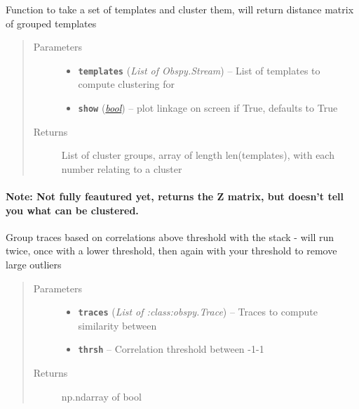 \documentclass[a4paper,10pt,english]{sphinxmanual}
\begin{document}
\begin{fulllineitems}
\label{utils:clustering.cluster}
Function to take a set of templates and cluster them, will return distance            matrix of grouped templates
\begin{quote}\begin{description}
\item[{Parameters}] \leavevmode\begin{itemize}
\item {} 
\textbf{\texttt{templates}} (\emph{List of Obspy.Stream}) -- List of templates to compute clustering for

\item {} 
\textbf{\texttt{show}} (\href{https://docs.python.org/library/functions.html\#bool}{\emph{bool}}) -- plot linkage on screen if True, defaults to True

\end{itemize}

\item[{Returns}] \leavevmode
List of cluster groups, array of length len(templates), with
each number relating to a cluster

\end{description}\end{quote}
\paragraph{Note:
Not fully feautured yet, returns the Z matrix, but doesn't tell you what        can be clustered.}

\end{fulllineitems}


\begin{fulllineitems}
\label{utils:clustering.corr_cluster}
Group traces based on correlations above threshold with the stack - will
run twice, once with a lower threshold, then again with your threshold to
remove large outliers
\begin{quote}\begin{description}
\item[{Parameters}] \leavevmode\begin{itemize}
\item {} 
\textbf{\texttt{traces}} (\emph{List of :class:obspy.Trace}) -- Traces to compute similarity between

\item {} 
\textbf{\texttt{thrsh}} -- Correlation threshold between -1-1

\end{itemize}

\item[{Returns}] \leavevmode
np.ndarray of bool

\end{description}\end{quote}

\end{fulllineitems}
\end{document}
